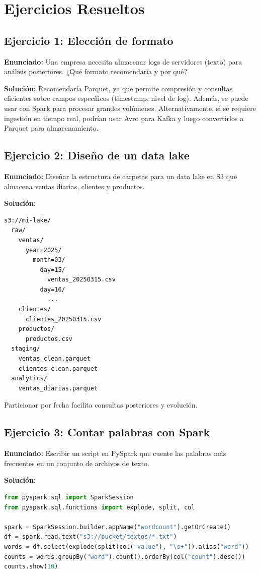 \documentclass[12pt,a4paper,openany,oneside]{book}
\begin{document}
\chapter{Ejercicios Resueltos}
\section{Ejercicio 1: Elección de formato}
\textbf{Enunciado:} Una empresa necesita almacenar logs de servidores (texto) para análisis posteriores. ¿Qué formato recomendaría y por qué?

\textbf{Solución:} Recomendaría Parquet, ya que permite compresión y consultas eficientes sobre campos específicos (timestamp, nivel de log). Además, se puede usar con Spark para procesar grandes volúmenes. Alternativamente, si se requiere ingestión en tiempo real, podrían usar Avro para Kafka y luego convertirlos a Parquet para almacenamiento.

\section{Ejercicio 2: Diseño de un data lake}
\textbf{Enunciado:} Diseñar la estructura de carpetas para un data lake en S3 que almacena ventas diarias, clientes y productos.

\textbf{Solución:}
\begin{verbatim}
s3://mi-lake/
  raw/
    ventas/
      year=2025/
        month=03/
          day=15/
            ventas_20250315.csv
          day=16/
            ...
    clientes/
      clientes_20250315.csv
    productos/
      productos.csv
  staging/
    ventas_clean.parquet
    clientes_clean.parquet
  analytics/
    ventas_diarias.parquet
\end{verbatim}
Particionar por fecha facilita consultas posteriores y evolución.

\section{Ejercicio 3: Contar palabras con Spark}
\textbf{Enunciado:} Escribir un script en PySpark que cuente las palabras más frecuentes en un conjunto de archivos de texto.

\textbf{Solución:}
\begin{lstlisting}[language=Python]
from pyspark.sql import SparkSession
from pyspark.sql.functions import explode, split, col

spark = SparkSession.builder.appName("wordcount").getOrCreate()
df = spark.read.text("s3://bucket/textos/*.txt")
words = df.select(explode(split(col("value"), "\s+")).alias("word"))
counts = words.groupBy("word").count().orderBy(col("count").desc())
counts.show(10)
\end{lstlisting}
\end{document}
